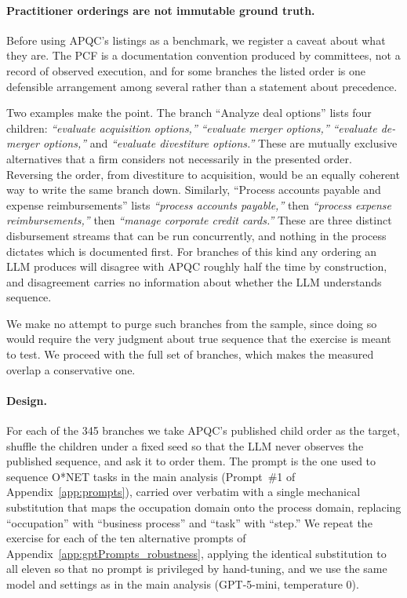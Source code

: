 \paragraph{Practitioner orderings are not immutable ground truth.}
\label{app:apqc_validation_caveat}
Before using APQC's listings as a benchmark, we register a caveat about what they are.
The PCF is a documentation convention produced by committees, not a record of observed execution, and for some branches the listed order is one defensible arrangement among several rather than a statement about precedence.

Two examples make the point.
The branch ``Analyze deal options'' lists four children: \textit{``evaluate acquisition options,''} \textit{``evaluate merger options,''} \textit{``evaluate de-merger options,''} and \textit{``evaluate divestiture options.''}
These are mutually exclusive alternatives that a firm considers not necessarily in the presented order.
Reversing the order, from divestiture to acquisition, would be an equally coherent way to write the same branch down.
Similarly, ``Process accounts payable and expense reimbursements'' lists \textit{``process accounts payable,''} then \textit{``process expense reimbursements,''} then \textit{``manage corporate credit cards.''}
These are three distinct disbursement streams that can be run concurrently, and nothing in the process dictates which is documented first.
For branches of this kind any ordering an LLM produces will disagree with APQC roughly half the time by construction, and disagreement carries no information about whether the LLM understands sequence.

We make no attempt to purge such branches from the sample, since doing so would require the very judgment about true sequence that the exercise is meant to test.
We proceed with the full set of branches, which makes the measured overlap a conservative one.

\paragraph{Design.}
\label{app:apqc_validation_design}
For each of the 345 branches we take APQC's published child order as the target, shuffle the children under a fixed seed so that the LLM never observes the published sequence, and ask it to order them.
The prompt is the one used to sequence O*NET tasks in the main analysis (Prompt~\#1 of Appendix~\ref{app:prompts}), carried over verbatim with a single mechanical substitution that maps the occupation domain onto the process domain, replacing ``occupation'' with ``business process'' and ``task'' with ``step.''
We repeat the exercise for each of the ten alternative prompts of Appendix~\ref{app:gptPrompts_robustness}, applying the identical substitution to all eleven so that no prompt is privileged by hand-tuning, and we use the same model and settings as in the main analysis (GPT-5-mini, temperature $0$).


